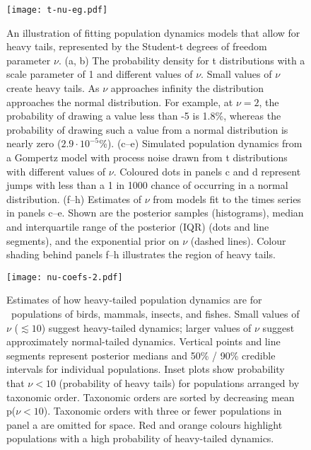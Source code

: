 

\begin{figure}[htbp]
\begin{center}
\texttt{[image: t-nu-eg.pdf]}
\caption{
An illustration of fitting population dynamics models that allow for heavy
tails, represented by the Student-t degrees of freedom parameter $\nu$. (a, b)
The probability density for t distributions with a scale parameter of 1 and
different values of $\nu$. Small values of $\nu$ create heavy tails. As $\nu$
approaches infinity the distribution approaches the normal distribution. For
example, at $\nu = 2$, the probability of drawing a value less than -5 is
1.8\%, whereas the probability of drawing such a value from a normal
distribution is nearly zero ($2.9\cdot10^{-5}$\%). (c--e) Simulated population
dynamics from a Gompertz model with process noise drawn from t distributions
with different values of $\nu$. Coloured dots in panels c and d represent jumps
with less than a 1 in 1000 chance of occurring in a normal distribution. (f--h)
Estimates of $\nu$ from models fit to the times series in panels c--e. Shown
are the posterior samples (histograms), median and interquartile range of the
posterior (IQR) (dots and line segments), and the exponential prior on $\nu$
(dashed lines). Colour shading behind panels f--h illustrates the region of
heavy tails.}
\label{fig:didactic}
\end{center}
\end{figure}

\clearpage

\begin{figure}[htbp]
\begin{center}
\texttt{[image: nu-coefs-2.pdf]}
\caption{
Estimates of how heavy-tailed population dynamics are for \nuCoefPopN\
populations of birds, mammals, insects, and fishes. Small values of $\nu$
($\lesssim 10$) suggest heavy-tailed dynamics; larger values of $\nu$ suggest
approximately normal-tailed dynamics. Vertical points and line segments
represent posterior medians and 50\% / 90\% credible intervals for individual
populations. Inset plots show probability that $\nu < 10$ (probability of heavy
tails) for populations arranged by taxonomic order. Taxonomic orders are sorted
by decreasing mean p($\nu < 10$). Taxonomic orders with three or fewer
populations in panel a are omitted for space. Red and orange colours highlight
populations with a high probability of heavy-tailed dynamics.
}
\label{fig:nu-coefs}
\end{center}
\end{figure}

